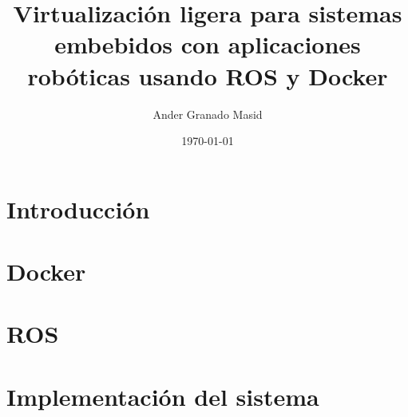 \documentclass[a4paper,12pt,oneside]{scrbook}
\title{Virtualización ligera para sistemas embebidos con aplicaciones robóticas usando ROS y Docker}
\author{Ander Granado Masid}
\date{\today}
\begin{document}
\frontmatter %

\tableofcontents %
\listoffigures %


\mainmatter %
\part{Introducción}
	
	

\part{Docker}
	
	

\part{ROS}
	
	
	
\part{Implementación del sistema}
	


\backmatter



\end{document}
